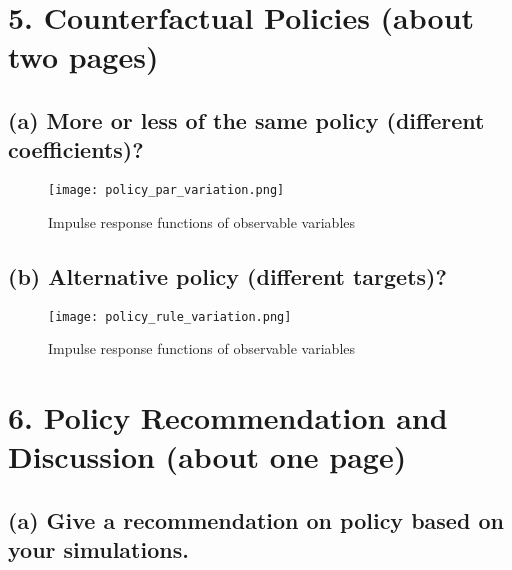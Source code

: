 \documentclass[12pt]{article}
\begin{document}
\newpage
\section*{5. Counterfactual Policies (about two pages)}
\subsection*{(a) More or less of the same policy (different coefficients)?}


\begin{figure}[!h]
    \caption{Impulse response functions of observable variables}\label{fig:policy_par_variation}
    \centering
    \texttt{[image: policy\_par\_variation.png]}
\end{figure}

\subsection*{(b) Alternative policy (different targets)?}


\begin{figure}[!h]
    \caption{Impulse response functions of observable variables}\label{fig:policy_rule_variation}
    \centering
    \texttt{[image: policy\_rule\_variation.png]}
\end{figure}







\section*{6. Policy Recommendation and Discussion (about one page)}
\subsection*{(a) Give a recommendation on policy based on your simulations.}
\end{document}
